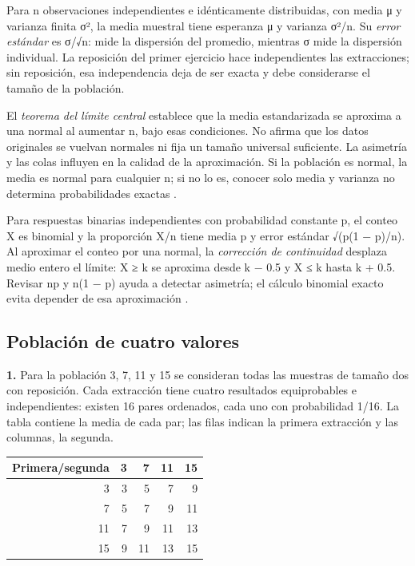 {Para n observaciones independientes e idénticamente distribuidas, con media μ y varianza finita σ², la media muestral tiene esperanza μ y varianza σ²/n. Su \textit{error estándar} es σ/√n: mide la dispersión del promedio, mientras σ mide la dispersión individual. La reposición del primer ejercicio hace independientes las extracciones; sin reposición, esa independencia deja de ser exacta y debe considerarse el tamaño de la población.

El \textit{teorema del límite central} establece que la media estandarizada se aproxima a una normal al aumentar n, bajo esas condiciones. No afirma que los datos originales se vuelvan normales ni fija un tamaño universal suficiente. La asimetría y las colas influyen en la calidad de la aproximación. Si la población es normal, la media es normal para cualquier n; si no lo es, conocer solo media y varianza no determina probabilidades exactas \citep[sec. 7.3]{wackerly2010}.

Para respuestas binarias independientes con probabilidad constante p, el conteo X es binomial y la proporción X/n tiene media p y error estándar √(p(1 − p)/n). Al aproximar el conteo por una normal, la \textit{corrección de continuidad} desplaza medio entero el límite: X ≥ k se aproxima desde k − 0.5 y X ≤ k hasta k + 0.5. Revisar np y n(1 − p) ayuda a detectar asimetría; el cálculo binomial exacto evita depender de esa aproximación \citep[sec. 7.5]{wackerly2010}.

\clearpage
\subsection{Población de cuatro valores}
\textbf{1.} Para la población 3, 7, 11 y 15 se consideran todas las muestras de tamaño dos con reposición. Cada extracción tiene cuatro resultados equiprobables e independientes: existen 16 pares ordenados, cada uno con probabilidad 1/16. La tabla contiene la media de cada par; las filas indican la primera extracción y las columnas, la segunda.

\begin{center}
\begin{tabular}{r|rrrr}
\textbf{Primera/segunda} & \textbf{3} & \textbf{7} & \textbf{11} & \textbf{15}\\\hline
3 & 3 & 5 & 7 & 9\\
7 & 5 & 7 & 9 & 11\\
11 & 7 & 9 & 11 & 13\\
15 & 9 & 11 & 13 & 15\\
\end{tabular}
\end{center}

}
